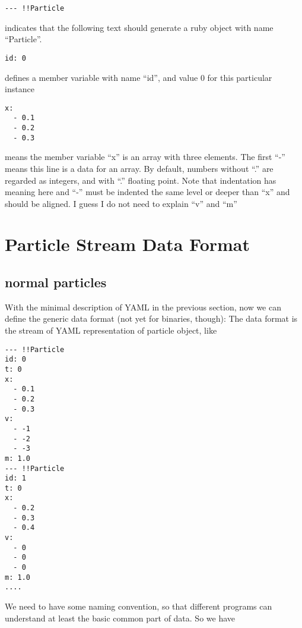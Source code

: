 \documentclass[12pt]{article}
\begin{document}
\begin{verbatim}
--- !!Particle
\end{verbatim}
indicates that the following text should generate a ruby object with
name ``Particle''.

\begin{verbatim}
id: 0
\end{verbatim}
defines a member variable with name ``id'', and value 0 for this
particular instance
\begin{verbatim}
x:
  - 0.1
  - 0.2
  - 0.3
\end{verbatim}
means the member variable ``x'' is an array with three elements. The
first ``-'' means this line is a data for an array.
By default, numbers without ``.'' are regarded as integers, and with
``.'' floating point. Note that indentation has meaning here and ``-''
must be indented the same level or deeper than ``x'' and should be aligned.
I guess I do not need to explain ``v'' and ``m''

\section{Particle Stream Data Format}


\subsection{normal particles}

With the  minimal description of YAML in the previous section, now
we can define the generic data format (not yet for binaries, though):
The data format is the stream of YAML representation of particle
object, like

\begin{verbatim}
--- !!Particle
id: 0
t: 0
x:
  - 0.1
  - 0.2
  - 0.3
v:
  - -1
  - -2
  - -3
m: 1.0
--- !!Particle
id: 1
t: 0
x:
  - 0.2
  - 0.3
  - 0.4
v:
  - 0
  - 0
  - 0
m: 1.0
....
\end{verbatim}
We need to have some naming convention, so that different programs can
understand at least the basic common part of data. So we have
\end{document}
